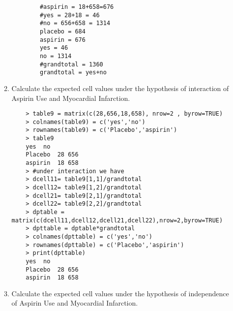 \documentclass[11pt]{article}
\begin{document}
\begin{enumerate}
\begin{enumerate}
\begin{verbatim}
		#aspirin = 18+658=676
		#yes = 28+18 = 46
		#no = 656+658 = 1314
		placebo = 684
		aspirin = 676
		yes = 46
		no = 1314
		#grandtotal = 1360
		grandtotal = yes+no 
	\end{verbatim}
	\item Calculate the expected cell values under the hypothesis of interaction of Aspirin Use and Myocardial Infarction.
	\begin{verbatim}
	> table9 = matrix(c(28,656,18,658), nrow=2 , byrow=TRUE)
	> colnames(table9) = c('yes','no')
	> rownames(table9) = c('Placebo','aspirin')
	> table9
	yes  no
	Placebo  28 656
	aspirin  18 658
	> #under interaction we have
	> dcell11= table9[1,1]/grandtotal
	> dcell12= table9[1,2]/grandtotal
	> dcell21= table9[2,1]/grandtotal
	> dcell22= table9[2,2]/grandtotal
	> dptable = matrix(c(dcell11,dcell12,dcell21,dcell22),nrow=2,byrow=TRUE)
	> dpttable = dptable*grandtotal
	> colnames(dpttable) = c('yes','no')
	> rownames(dpttable) = c('Placebo','aspirin')
	> print(dpttable)
	yes  no
	Placebo  28 656
	aspirin  18 658
	\end{verbatim}
	\item Calculate the expected cell values under the hypothesis of independence of Aspirin Use and Myocardial Infarction.
	\begin{verbatim}
	

\end{verbatim}
\end{enumerate}
\end{enumerate}
\end{document}

